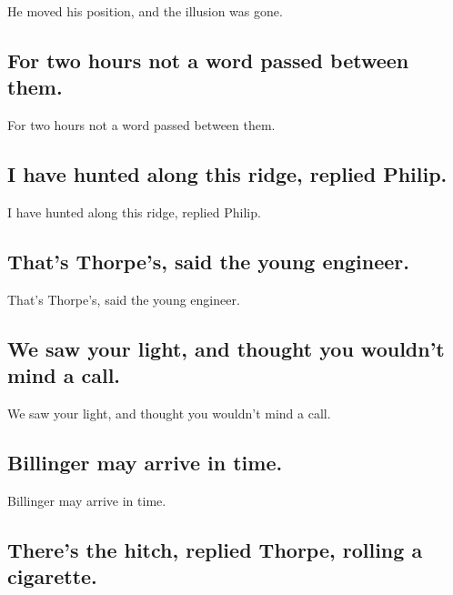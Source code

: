 \documentclass[]{article}
\begin{document}
He moved his position, and the illusion was gone.

\hypertarget{for-two-hours-not-a-word-passed-between-them.}{%
\subsection{For two hours not a word passed between
them.}\label{for-two-hours-not-a-word-passed-between-them.}}

For two hours not a word passed between them.

\hypertarget{i-have-hunted-along-this-ridge-replied-philip.}{%
\subsection{I have hunted along this ridge, replied
Philip.}\label{i-have-hunted-along-this-ridge-replied-philip.}}

I have hunted along this ridge, replied Philip.

\hypertarget{thats-thorpes-said-the-young-engineer.}{%
\subsection{That's Thorpe's, said the young
engineer.}\label{thats-thorpes-said-the-young-engineer.}}

That's Thorpe's, said the young engineer.

\hypertarget{we-saw-your-light-and-thought-you-wouldnt-mind-a-call.}{%
\subsection{We saw your light, and thought you wouldn't mind a
call.}\label{we-saw-your-light-and-thought-you-wouldnt-mind-a-call.}}

We saw your light, and thought you wouldn't mind a call.

\hypertarget{billinger-may-arrive-in-time.}{%
\subsection{Billinger may arrive in
time.}\label{billinger-may-arrive-in-time.}}

Billinger may arrive in time.

\hypertarget{theres-the-hitch-replied-thorpe-rolling-a-cigarette.}{%
\subsection{There's the hitch, replied Thorpe, rolling a
cigarette.}\label{theres-the-hitch-replied-thorpe-rolling-a-cigarette.}}
\end{document}
